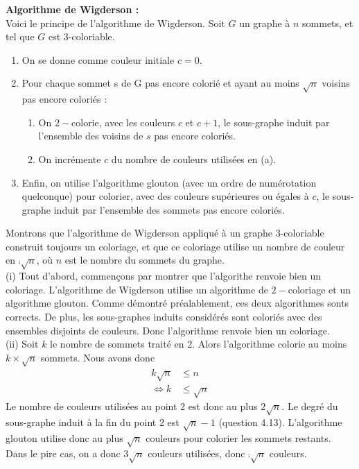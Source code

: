 \textbf{Algorithme de Wigderson :}\\
Voici le principe de l’algorithme de Wigderson. Soit $G$ un graphe à $n$ sommets, et tel que $G$
est 3-coloriable.
\begin{enumerate}
    \item On se donne comme couleur initiale $c = 0$.
    \item Pour chaque sommet s de G pas encore colorié et ayant au moins $\sqrt{n}$ voisins pas encore
coloriés :
    \begin{enumerate}
        \item On $2-$colorie, avec les couleurs $c$ et $c + 1$, le sous-graphe induit par l’ensemble des voisins
de $s$ pas encore coloriés.
        \item On incrémente $c$ du nombre de couleurs utilisées en (a).
    \end{enumerate}
    \item Enfin, on utilise l’algorithme glouton (avec un ordre de numérotation quelconque) pour
colorier, avec des couleurs supérieures ou égales à $c$, le sous-graphe induit par l’ensemble des
sommets pas encore coloriés.
\end{enumerate}

Montrons que l’algorithme de Wigderson appliqué à un graphe 3-coloriable construit toujours un coloriage, et que ce coloriage utilise un nombre de couleur en $\comp{\sqrt{n}}$,
où $n$ est le nombre du sommets du graphe.\\

(i)
Tout d'abord, commençons par montrer que l'algorithe renvoie bien un coloriage. L'algorithme de Wigderson utilise un algorithme de $2-$coloriage et un algorithme glouton. Comme démontré préalablement, ces deux algorithmes sonts corrects. 
De plus, les sous-graphes induits considérés sont coloriés avec des ensembles disjoints de couleurs.
Donc l'algorithme renvoie bien un coloriage.\\

(ii)
Soit $k$ le nombre de sommets traité en 2. Alors l'algorithme colorie au moins $k\times \sqrt{n}$ sommets.
Nous avons donc 
\begin{align*}
    k\sqrt{n} &\leq n\\
    \iff k &\leq \sqrt{n} 
\end{align*}
Le nombre de couleurs utilisées au point 2 est donc au plus $2\sqrt{n}$. Le degré du sous-graphe induit à la fin du point 2 est $\sqrt{n}-1$ (question 4.13). L'algorithme glouton utilise donc au plus $\sqrt{n}$ couleurs pour colorier les sommets restants. Dans le pire cas, on a donc $3\sqrt{n}$ couleurs utilisées, donc $\comp{\sqrt{n}}$ couleurs.

